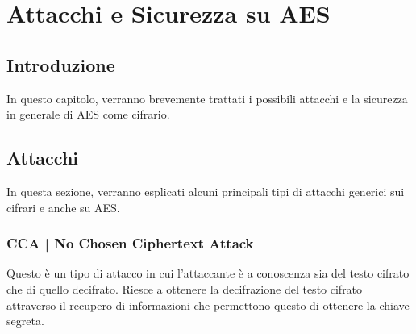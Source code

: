 
\chapter{Attacchi e Sicurezza su AES} %





\section{Introduzione}

\textsf{\small In questo capitolo, verranno brevemente trattati i possibili attacchi e la sicurezza in generale di AES come cifrario.}


\section{Attacchi}

\textsf{\small In questa sezione, verranno esplicati alcuni principali tipi di attacchi generici sui cifrari e anche su AES.} %

\subsection{CCA | No Chosen Ciphertext Attack}

\textsf{\small Questo è un tipo di attacco in cui l'attaccante è a conoscenza sia del testo cifrato che di quello decifrato. Riesce a ottenere la decifrazione del testo cifrato attraverso il recupero di informazioni che permettono questo di ottenere la chiave segreta.}




